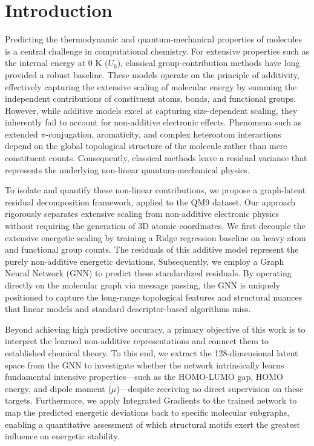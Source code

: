 \documentclass[]{article}
\begin{document}
\section{Introduction}
\label{sec:introduction}
Predicting the thermodynamic and quantum-mechanical properties of molecules is a central challenge in computational chemistry. For extensive properties such as the internal energy at 0 K ($U_0$), classical group-contribution methods have long provided a robust baseline. These models operate on the principle of additivity, effectively capturing the extensive scaling of molecular energy by summing the independent contributions of constituent atoms, bonds, and functional groups. However, while additive models excel at capturing size-dependent scaling, they inherently fail to account for non-additive electronic effects. Phenomena such as extended $\pi$-conjugation, aromaticity, and complex heteroatom interactions depend on the global topological structure of the molecule rather than mere constituent counts. Consequently, classical methods leave a residual variance that represents the underlying non-linear quantum-mechanical physics.

To isolate and quantify these non-linear contributions, we propose a graph-latent residual decomposition framework, applied to the QM9 dataset. Our approach rigorously separates extensive scaling from non-additive electronic physics without requiring the generation of 3D atomic coordinates. We first decouple the extensive energetic scaling by training a Ridge regression baseline on heavy atom and functional group counts. The residuals of this additive model represent the purely non-additive energetic deviations. Subsequently, we employ a Graph Neural Network (GNN) to predict these standardized residuals. By operating directly on the molecular graph via message passing, the GNN is uniquely positioned to capture the long-range topological features and structural nuances that linear models and standard descriptor-based algorithms miss.

Beyond achieving high predictive accuracy, a primary objective of this work is to interpret the learned non-additive representations and connect them to established chemical theory. To this end, we extract the 128-dimensional latent space from the GNN to investigate whether the network intrinsically learns fundamental intensive properties—such as the HOMO-LUMO gap, HOMO energy, and dipole moment ($\mu$)—despite receiving no direct supervision on these targets. Furthermore, we apply Integrated Gradients to the trained network to map the predicted energetic deviations back to specific molecular subgraphs, enabling a quantitative assessment of which structural motifs exert the greatest influence on energetic stability.
\end{document}
